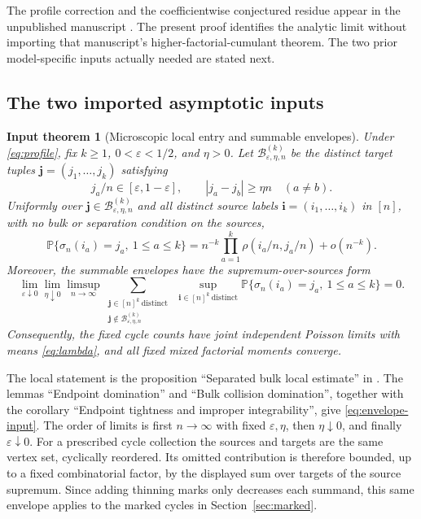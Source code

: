 \documentclass[11pt]{article}
\numberwithin{equation}{section}
\newtheorem{inputtheorem}[theorem]{Input theorem}
\theoremstyle{definition}
\theoremstyle{remark}
\newcommand{\Pp}{\mathbb P}
\newcommand{\eps}{\varepsilon}
\begin{document}
The profile correction and the coefficientwise conjectured residue appear in the unpublished manuscript \cite{LongMean}. The present proof identifies the analytic limit without importing that manuscript's higher-factorial-cumulant theorem. The two prior model-specific inputs actually needed are stated next.

\subsection{The two imported asymptotic inputs}\label{subsec:inputs}

\begin{inputtheorem}[Microscopic local entry and summable envelopes]\label{input:micro}
Under \eqref{eq:profile}, fix $k\ge1$, $0<\eps<1/2$, and $\eta>0$.
Let $\mathcal B_{\eps,\eta,n}^{(k)}$ be the distinct target tuples
$\mathbf j=(j_1,\ldots,j_k)$ satisfying
\[
 j_a/n\in[\eps,1-\eps],\qquad |j_a-j_b|\ge\eta n\quad(a\ne b).
\]
Uniformly over $\mathbf j\in\mathcal B_{\eps,\eta,n}^{(k)}$ and all distinct
source labels $\mathbf i=(i_1,\ldots,i_k)$ in $[n]$, with no bulk or separation
condition on the sources,
\begin{equation}\label{eq:local-input}
 \Pp\{\sigma_n(i_a)=j_a,\ 1\le a\le k\}
 =n^{-k}\prod_{a=1}^k\rho(i_a/n,j_a/n)+o(n^{-k}).
\end{equation}
Moreover, the summable envelopes have the supremum-over-sources form
\begin{equation}\label{eq:envelope-input}
 \lim_{\eps\downarrow0}\lim_{\eta\downarrow0}\limsup_{n\to\infty}
 \sum_{\substack{\mathbf j\in[n]^k\ \mathrm{distinct}\\
                 \mathbf j\notin\mathcal B_{\eps,\eta,n}^{(k)}}}
 \ \sup_{\mathbf i\in[n]^k\ \mathrm{distinct}}
 \Pp\{\sigma_n(i_a)=j_a,\ 1\le a\le k\}=0.
\end{equation}
Consequently, the fixed cycle counts have joint independent Poisson limits
with means \eqref{eq:lambda}, and all fixed mixed factorial moments converge.
\end{inputtheorem}

The local statement is the proposition ``Separated bulk local estimate'' in
\cite[Section~3]{LongMicro}. The lemmas ``Endpoint domination'' and
``Bulk collision domination'', together with the corollary ``Endpoint tightness
and improper integrability'', give \eqref{eq:envelope-input}. The order of limits
is first $n\to\infty$ with fixed $\eps,\eta$, then $\eta\downarrow0$, and finally
$\eps\downarrow0$. For a prescribed cycle collection the sources and targets
are the same vertex set, cyclically reordered. Its omitted contribution is
therefore bounded, up to a fixed combinatorial factor, by the displayed
sum over targets of the source supremum. Since adding thinning marks only
decreases each summand, this same envelope applies to the marked cycles in
Section~\ref{sec:marked}.
\end{document}
